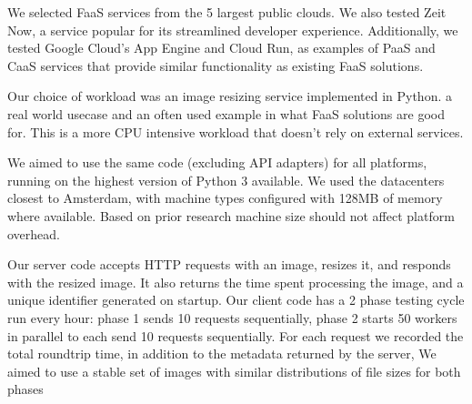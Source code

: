 \documentclass[11pt]{article}
\begin{document}
We selected FaaS services from the 5 largest public clouds. %
We also tested Zeit Now, a service popular for its streamlined developer experience.
Additionally, we tested Google Cloud's App Engine and Cloud Run,
as examples of PaaS and CaaS services that provide similar functionality as existing FaaS solutions.

Our choice of workload was an image resizing service implemented in Python.
a real world %
usecase and an often used example in what FaaS solutions are good for. %
This is a more CPU intensive workload that
doesn't rely on external services.

We aimed to use the same code (excluding API adapters) for all platforms,
running on the highest version of Python 3 available.
We used the datacenters closest to Amsterdam,
with machine types configured with 128MB of memory where available.
Based on prior research %
machine size should not affect platform overhead.

Our server code accepts HTTP requests with an image,
resizes it, and responds with the resized image.
It also returns the time spent processing the image,
and a unique identifier generated on startup.
Our client code has a 2 phase testing cycle run every hour:
phase 1 sends 10 requests sequentially,
phase 2 starts 50 workers in parallel to each send 10 requests sequentially.
For each request we recorded the total roundtrip time,
in addition to the metadata returned by the server,
We aimed to use a stable set of images with similar distributions
of file sizes for both phases
\end{document}
